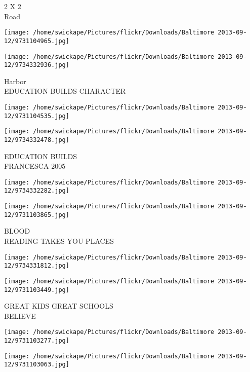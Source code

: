 \documentclass[10pt,letterpaper]{article}
\begin{document}
2 X 2\\
Road\\
\pagebreak

\texttt{[image: /home/swickape/Pictures/flickr/Downloads/Baltimore 2013-09-12/9731104965.jpg]}

\vspace{0.25in}
\texttt{[image: /home/swickape/Pictures/flickr/Downloads/Baltimore 2013-09-12/9734332936.jpg]}

Harbor\\
EDUCATION BUILDS CHARACTER\\
\pagebreak

\texttt{[image: /home/swickape/Pictures/flickr/Downloads/Baltimore 2013-09-12/9731104535.jpg]}

\vspace{0.25in}
\texttt{[image: /home/swickape/Pictures/flickr/Downloads/Baltimore 2013-09-12/9734332478.jpg]}

EDUCATION BUILDS\\
FRANCESCA 2005\\
\pagebreak

\texttt{[image: /home/swickape/Pictures/flickr/Downloads/Baltimore 2013-09-12/9734332282.jpg]}

\vspace{0.25in}
\texttt{[image: /home/swickape/Pictures/flickr/Downloads/Baltimore 2013-09-12/9731103865.jpg]}

BLOOD\\
READING TAKES YOU PLACES\\
\pagebreak

\texttt{[image: /home/swickape/Pictures/flickr/Downloads/Baltimore 2013-09-12/9734331812.jpg]}

\vspace{0.25in}
\texttt{[image: /home/swickape/Pictures/flickr/Downloads/Baltimore 2013-09-12/9731103449.jpg]}

GREAT KIDS GREAT SCHOOLS\\
BELIEVE\\
\pagebreak

\texttt{[image: /home/swickape/Pictures/flickr/Downloads/Baltimore 2013-09-12/9731103277.jpg]}

\vspace{0.25in}
\texttt{[image: /home/swickape/Pictures/flickr/Downloads/Baltimore 2013-09-12/9731103063.jpg]}
\end{document}
